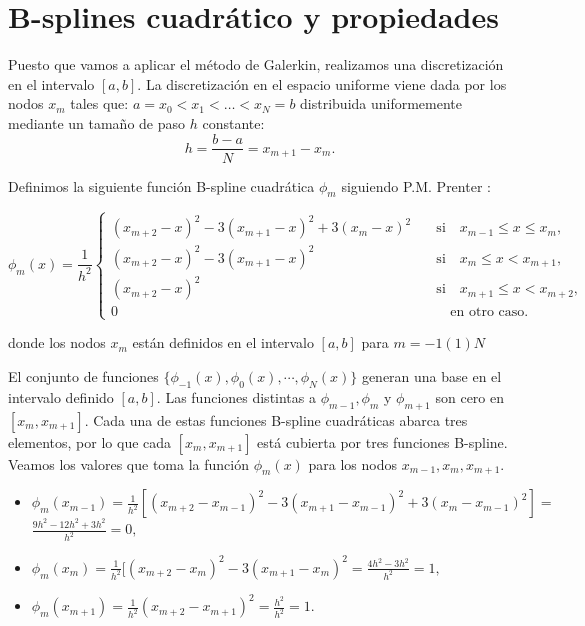 \section{B-splines cuadrático y propiedades}

Puesto que vamos a aplicar el método de Galerkin, realizamos una discretización en el intervalo $[a,b]$. La discretización en el espacio uniforme viene dada por los nodos $x_{m}$ tales que: $a=x_{0}<x_{1}<\dots<x_{N}=b$ distribuida uniformemente mediante un tamaño de paso $h$ constante: $$h=\frac{b-a}{N}=x_{m+1}-x_{m}.$$

Definimos la siguiente función B-spline cuadrática $\phi_{m}$ siguiendo P.M. Prenter \cite{prenter9}:

\begin{equation}
\label{ec_bspline}
 \phi_{m}(x)=\frac{1}{h^{2}}
        \left\{
        \begin{align}
          (x_{m+2}-x)^{2} -3(x_{m+1}-x)^{2}+3(x_{m}-x)^{2}
          & \quad \text{si} \quad x_{m-1}\leq x \leq x_{m},\\ 
        (x_{m+2}-x)^{2} -3(x_{m+1}-x)^{2} & \quad \text{si} \quad x_{m}\leq x < x_{m+1},\\
        (x_{m+2}-x)^{2} & \quad \text{si} \quad x_{m+1}\leq x < x_{m+2},\\ 
        0 & \quad \quad \text{en otro caso.}
        \end{align}
        \right.
\end{equation} 


\noindent donde los nodos $x_{m}$ están definidos en el intervalo $[a,b]$ para $m=-1(1)N$

El conjunto de funciones $\{\phi_{-1}(x) , \phi_{0}(x) ,\cdots, \phi_{N}(x)\}$  generan una base en el intervalo definido $[a,b]$. Las funciones distintas a $\phi_{m-1} , \phi_{m}$ y $ \phi_{m+1}$ son cero en $[x_{m},x_{m+1}]$. Cada una de estas funciones B-spline cuadráticas abarca tres elementos, por lo que cada $[x_{m},x_{m+1}] $ está cubierta por tres funciones B-spline.\\

\noindent Veamos los valores que toma la función $\phi_{m}(x)$ para los nodos $x_{m-1},x_{m},x_{m+1}$.

\begin{itemize}
    \item $\phi_{m}(x_{m-1})=\frac{1}{h^{2}}[(x_{m+2}-x_{m-1})^{2}-3(x_{m+1}-x_{m-1})^{2}+3(x_{m}-x_{m-1})^{2}]=$\\
    
    $\frac{9h^{2}-12h^{2}+3h^{2}}{h^{2}}=0,$
    
    \item $\phi_{m}(x_{m})=\frac{1}{h^{2}}[(x_{m+2}-x_{m})^{2}-3(x_{m+1}-x_{m})^{2}=\frac{4h^{2}-3h^{2}}{h^{2}}=1,$
    
    \item $\phi_{m}(x_{m+1})=\frac{1}{h^{2}}(x_{m+2}-x_{m+1})^{2}=\frac{h^{2}}{h^{2}}=1.$
    
\end{itemize}


